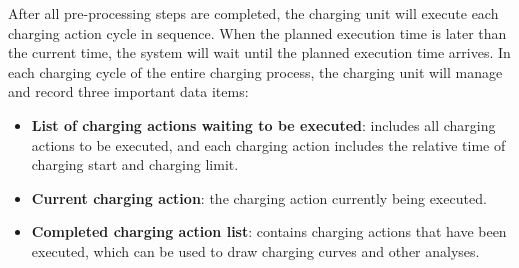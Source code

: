 \documentclass[
	english,
	ruledheaders=section,%
	class=report,%
	thesis={type=Report},%
	accentcolor=9c,%
	custommargins=true,%
	marginpar=false,%
	parskip=half-,%
	fontsize=11pt,%
	logofile={img/tuda_logo.pdf}, %
]{tudapub}
\begin{document}
\begin{enumerate}[label=\Alph*.]
    

    

    After all pre-processing steps are completed, the charging unit will execute each charging action cycle in sequence. When the planned execution time is later than the current time, the system will wait until the planned execution time arrives.
    In each charging cycle of the entire charging process, the charging unit will manage and record three important data items:
    \begin{itemize}
    \item \textbf{List of charging actions waiting to be executed}: includes all charging actions to be executed, and each charging action includes the relative time of charging start and charging limit.
    \item \textbf{Current charging action}: the charging action currently being executed.
    \item \textbf{Completed charging action list}: contains charging actions that have been executed, which can be used to draw charging curves and other analyses.
    \end{itemize}
    

\end{enumerate}
\end{document}
